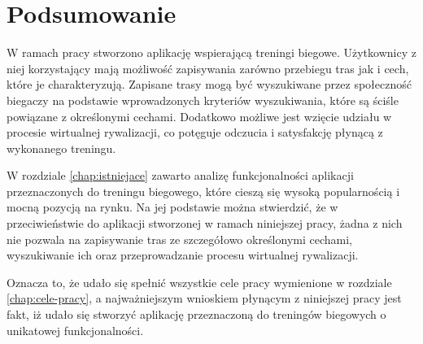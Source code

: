 \chapter{Podsumowanie}\label{chap:introduction}
W ramach pracy stworzono aplikację wspierającą treningi biegowe. Użytkownicy z niej korzystający mają możliwość zapisywania zarówno przebiegu tras jak i cech, które je charakteryzują. Zapisane trasy mogą być wyszukiwane przez społeczność biegaczy na podstawie wprowadzonych kryteriów wyszukiwania, które są ściśle powiązane z określonymi cechami. Dodatkowo możliwe jest wzięcie udziału w procesie wirtualnej rywalizacji, co potęguje odczucia i satysfakcję płynącą z wykonanego treningu. 

W rozdziale \ref{chap:istniejace} zawarto analizę funkcjonalności aplikacji przeznaczonych do treningu biegowego, które cieszą się wysoką popularnością i mocną pozycją na rynku. Na jej podstawie można stwierdzić, że w przeciwieństwie do aplikacji stworzonej w ramach niniejszej pracy, żadna z nich nie pozwala na zapisywanie tras ze szczegółowo określonymi cechami, wyszukiwanie ich oraz przeprowadzanie procesu wirtualnej rywalizacji.

Oznacza to, że udało się spełnić wszystkie cele pracy wymienione w rozdziale \ref{chap:cele-pracy}, a najważniejszym wnioskiem płynącym z niniejszej pracy jest fakt, iż udało się stworzyć aplikację przeznaczoną do treningów biegowych o unikatowej funkcjonalności.